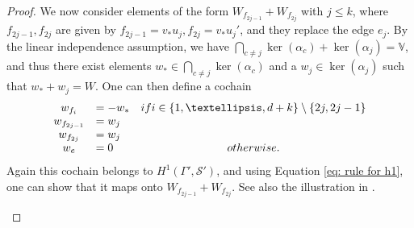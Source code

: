 \documentclass[10pt,a4paper]{amsart}
\begin{document}
\begin{proof}
We now consider elements of the form $W_{f_{2j -1}} + W_{f_{2j}}$ with $j\leq k$, where $f_{2j-1},f_{2j}$ are given by $f_{2j-1} = v_*u_j, f_{2j} = v_*u_j'$, and they replace the edge $e_{j}$. By the linear independence assumption, we have $\bigcap_{c \neq j} \ker(\alpha_c) + \ker(\alpha_j) = \mathbb{V}$, and thus there exist elements $w_{*} \in \bigcap_{c \neq j} \ker(\alpha_c)$ and a $w_j \in \ker(\alpha_j)$ such that $w_* + w_j  = W$. One can then define a cochain
\begin{equation*}
\begin{array}{clcc}
    w_{f_{i}} &= - w_{*}  & \textup{if } i\in \{1, \dots, d+k\} \setminus \{2j, 2j-1\}\\
    w_{f_{2j-1}} &= w_{j}  & \\
    w_{f_{2j}} &= w_{j}  & \\
    w_{e} &=0  &\textup{ otherwise.}
\end{array}
\end{equation*}
 Again this cochain belongs to $H^{1}(\Gamma', \mathcal{S}')$, and using Equation \eqref{eq: rule for h1}, one can show that it maps onto $W_{f_{2j-1}} + W_{f_{2j}}$. See also the illustration in .\\


\begin{figure}[h!]
\centering
{}
\end{figure}
\end{proof}
\end{document}

